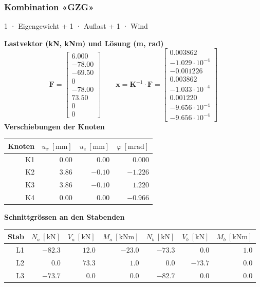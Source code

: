\documentclass[11pt,a4paper]{article}
\begin{document}
\subsubsection{Kombination «GZG»}
1 · Eigengewicht + 1 · Auflast + 1 · Wind

\noindent\textbf{Lastvektor (kN, kNm) und Lösung (m, rad)}
\begin{equation*}
\mathbf{F} = \begin{bmatrix} 6.000 \\ -78.00 \\ -69.50 \\ 0 \\ -78.00 \\ 73.50 \\ 0 \\ 0 \end{bmatrix} \qquad \mathbf{x} = \mathbf{K}^{-1} \cdot \mathbf{F} = \begin{bmatrix} 0.003862 \\ -1.029 \cdot 10^{-4} \\ -0.001226 \\ 0.003862 \\ -1.033 \cdot 10^{-4} \\ 0.001220 \\ -9.656 \cdot 10^{-4} \\ -9.656 \cdot 10^{-4} \end{bmatrix}
\end{equation*}
\noindent\textbf{Verschiebungen der Knoten}
\begin{longtable}{rrrr}
\hline
Knoten & $u_x\ [\mathrm{mm}]$ & $u_z\ [\mathrm{mm}]$ & $\varphi\ [\mathrm{mrad}]$ \\
\hline
\endhead
K1 & $0.00$ & $0.00$ & $0.000$ \\
K2 & $3.86$ & $-0.10$ & $-1.226$ \\
K3 & $3.86$ & $-0.10$ & $1.220$ \\
K4 & $0.00$ & $0.00$ & $-0.966$ \\
\hline
\end{longtable}
\noindent\textbf{Schnittgrössen an den Stabenden}
\begin{longtable}{rrrrrrr}
\hline
Stab & $N_{a}\ [\mathrm{kN}]$ & $V_{a}\ [\mathrm{kN}]$ & $M_{a}\ [\mathrm{kNm}]$ & $N_{b}\ [\mathrm{kN}]$ & $V_{b}\ [\mathrm{kN}]$ & $M_{b}\ [\mathrm{kNm}]$ \\
\hline
\endhead
L1 & $-82.3$ & $12.0$ & $-23.0$ & $-73.3$ & $0.0$ & $1.0$ \\
L2 & $0.0$ & $73.3$ & $1.0$ & $0.0$ & $-73.7$ & $0.0$ \\
L3 & $-73.7$ & $0.0$ & $0.0$ & $-82.7$ & $0.0$ & $0.0$ \\
\hline
\end{longtable}
\end{document}
